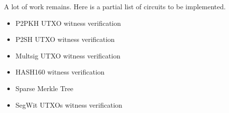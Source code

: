 \documentclass[10pt]{article}
\begin{document}
A lot of work remains. Here is a partial list of circuits to be implemented.
\begin{itemize}
  \item P2PKH UTXO witness verification
  \item P2SH UTXO witness verification
  \item Multsig UTXO witness verification
  \item HASH160 witness verification
  \item Sparse Merkle Tree
  \item SegWit UTXOs witness verification
\end{itemize}



\newpage


\end{document}
